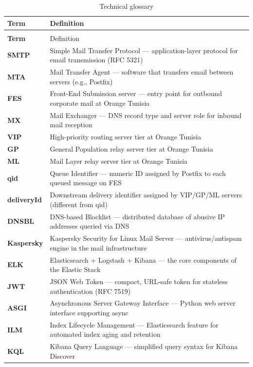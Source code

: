 \documentclass[12pt,a4paper,oneside]{report}
\newcommand{\rowA}{\rowcolor{rowgray}}
\begin{document}
\begin{longtable}{@{}>{\bfseries}p{4.5cm} >{\raggedright\arraybackslash}p{\dimexpr\linewidth-5cm\relax}@{}}
\caption{Technical glossary} \label{tab:glossary} \\
\toprule
Term & Definition \\
\midrule
\endfirsthead
\multicolumn{2}{@{}l}{\small\itshape (Glossary continued)} \\
\toprule
Term & Definition \\
\midrule
\endhead
\bottomrule
\endlastfoot
SMTP & Simple Mail Transfer Protocol --- application-layer protocol for email transmission (RFC 5321) \\
\rowA MTA & Mail Transfer Agent --- software that transfers email between servers (e.g., Postfix) \\
FES & Front-End Submission server --- entry point for outbound corporate mail at Orange Tunisia \\
\rowA MX & Mail Exchanger --- DNS record type and server role for inbound mail reception \\
VIP & High-priority routing server tier at Orange Tunisia \\
\rowA GP & General Population relay server tier at Orange Tunisia \\
ML & Mail Layer relay server tier at Orange Tunisia \\
\rowA qid & Queue Identifier --- numeric ID assigned by Postfix to each queued message on FES \\
deliveryId & Downstream delivery identifier assigned by VIP/GP/ML servers (different from qid) \\
\rowA DNSBL & DNS-based Blocklist --- distributed database of abusive IP addresses queried via DNS \\
Kaspersky & Kaspersky Security for Linux Mail Server --- antivirus/antispam engine in the mail infrastructure \\
\rowA ELK & Elasticsearch + Logstash + Kibana --- the core components of the Elastic Stack \\
JWT & JSON Web Token --- compact, URL-safe token for stateless authentication (RFC 7519) \\
\rowA ASGI & Asynchronous Server Gateway Interface --- Python web server interface supporting async \\
ILM & Index Lifecycle Management --- Elasticsearch feature for automated index aging and retention \\
\rowA KQL & Kibana Query Language --- simplified query syntax for Kibana Discover \\

\end{longtable}
\end{document}
